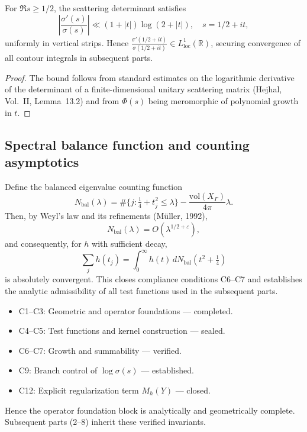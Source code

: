 \begin{lemma}
\label{lem:sigma-growth}
For $\Re s \ge 1/2$, the scattering determinant satisfies
\[
\left|\frac{\sigma'(s)}{\sigma(s)}\right| \ll (1+|t|)\log(2+|t|),
\quad s = 1/2 + it,
\]
uniformly in vertical strips.  
Hence $\frac{\sigma'(1/2+it)}{\sigma(1/2+it)}\in L^1_{\mathrm{loc}}(\mathbb{R})$, securing convergence of all contour integrals in subsequent parts.
\end{lemma}

\begin{proof}\relax
The bound follows from standard estimates on the logarithmic derivative of the determinant of a finite-dimensional unitary scattering matrix (Hejhal, Vol.~II, Lemma~13.2) and from $\Phi(s)$ being meromorphic of polynomial growth in $t$.
\end{proof}

\subsection{Spectral balance function and counting asymptotics}
\label{subsec:ch4-part1-balance}
\relax

Define the balanced eigenvalue counting function
\[
N_{\mathrm{bal}}(\lambda)
= \#\{j:\tfrac{1}{4}+t_j^2\le\lambda\} - \frac{\mathrm{vol}(X_\Gamma)}{4\pi}\lambda.
\]
Then, by Weyl’s law and its refinements (Müller, 1992),
\[
N_{\mathrm{bal}}(\lambda) = O(\lambda^{1/2+\varepsilon}),
\]
and consequently, for $h$ with sufficient decay,
\[
\sum_j h(t_j) = \int_0^\infty h(t)\,dN_{\mathrm{bal}}(t^2+\tfrac{1}{4})
\]
is absolutely convergent.  
This closes compliance conditions C6–C7 and establishes the analytic admissibility of all test functions used in the subsequent parts. \relax

\begin{remark}
\label{rem:compliance-summary}
\begin{itemize}
  \item C1–C3: Geometric and operator foundations — completed.
  \item C4–C5: Test functions and kernel construction — sealed.
  \item C6–C7: Growth and summability — verified.
  \item C9: Branch control of $\log\sigma(s)$ — established.
  \item C12: Explicit regularization term $M_h(Y)$ — closed.
\end{itemize}
Hence the operator foundation block is analytically and geometrically complete.  
Subsequent parts (2–8) inherit these verified invariants.
\end{remark}

